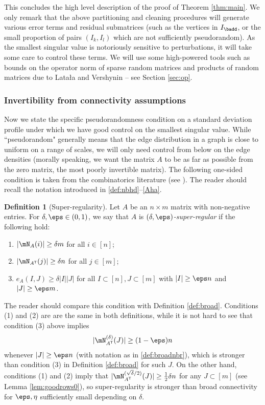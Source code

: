 \documentclass[aop,preprint]{imsart}
\theoremstyle{plain}
\theoremstyle{definition}
\newtheorem{definition}[theorem]{Definition}
\theoremstyle{remark}
\numberwithin{equation}{section}
\numberwithin{theorem}{section}
\def \tran {\mathsf{T}}
\begin{document}
This concludes the high level description of the proof of Theorem \ref{thm:main}. 
We only remark that the above partitioning and cleaning procedures will generate various error terms and residual submatrices (such as the vertices in $I_{\badd}$, or the small proportion of pairs $(I_k,I_l)$ which are not sufficiently pseudorandom). 
As the smallest singular value is notoriously sensitive to perturbations, it will take some care to control these terms.
We will use some high-powered tools such as bounds on the operator norm of sparse random matrices and products of random matrices due to Lata\l a and Vershynin -- see Section \ref{sec:op}. 


\subsubsection*{Invertibility from connectivity assumptions}

Now we state the specific pseudorandomness condition on a standard deviation profile under which we have good control on the smallest singular value.
While ``pseudorandom" generally means that the edge distribution in a graph is close to uniform on a range of scales, we will only need control from below on the edge densities (morally speaking, we want the matrix $A$ to be as far as possible from the zero matrix, the most poorly invertible matrix). 
The following one-sided condition is taken from the combinatorics literature (see \cite[Definition 1.6]{KoSi:survey}). The reader should recall the notation introduced in \eqref{def:nbhd}--\eqref{Aha}.

\begin{definition}[Super-regularity]	\label{def:super}
Let $A$ be an $n\times m$ matrix with non-negative entries.
For $\delta,\eps\in (0,1)$, we say that $A$ is \emph{$(\delta,\eps)$-super-regular} if the following hold:
\begin{enumerate}[(1)]
\item $|\mN_A(i)| \ge \delta m$ for all $i\in [n]$;
\item $|\mN_{A^\tran}(j)|\ge \delta n$ for all $j\in [m]$;
\item $e_A(I,J)\ge \delta |I||J|$ for all $I\subset[n],J\subset[m]$ with $|I|\ge \eps n$ and $|J|\ge \eps m$. 
\end{enumerate}
\end{definition}

The reader should compare this condition with Definition \ref{def:broad}. 
Conditions (1) and (2) are are the same in both definitions, while it is not hard to see that condition (3) above implies 
\begin{equation}
|\mN_{A^\tran}^{(\delta)}(J)| \ge (1-\eps)n
\end{equation}
whenever $|J|\ge \eps n$ (with notation as in \eqref{def:broadnbr}), which is stronger than condition (3) in Definition \ref{def:broad} for such $J$. 
On the other hand, conditions (1) and (2) imply that $|\mN_{A^\tran}^{(\sqrt{\delta}/2)}(J)|\ge \frac12\delta n$ for any $J\subset[m]$ (see Lemma \ref{lem:goodrows0}), so super-regularity is stronger than broad connectivity for $\eps,\eta$ sufficiently small depending on $\delta$.
\end{document}
